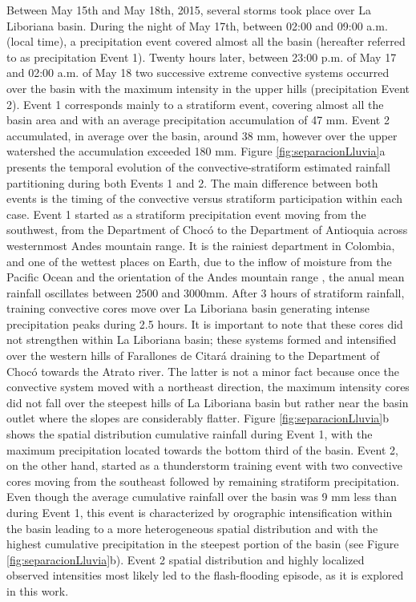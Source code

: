 \documentclass[hess, manuscript]{copernicus}
\begin{document}
Between May 15th and May 18th, 2015, several storms took place over La Liboriana basin.  During the night of May 17th, between 02:00 and 09:00 a.m. (local time), a precipitation event covered almost all the basin (hereafter referred to as precipitation Event 1).  Twenty hours later, between 23:00 p.m. of May 17 and 02:00 a.m. of May 18 two successive extreme convective systems occurred over the basin with the maximum intensity in the upper hills (precipitation Event 2).  Event 1 corresponds mainly to a stratiform event, covering almost all the basin area and with an average precipitation accumulation of 47 $\text{mm}$. Event 2 accumulated, in average over the basin, around 38 $\text{mm}$, however over the upper watershed the accumulation exceeded 180 $\text{mm}$. Figure \ref{fig:separacionLluvia}a presents the temporal evolution of the convective-stratiform estimated rainfall partitioning during both Events 1 and 2. The main difference between both events is the timing of the convective versus stratiform participation within each case. Event 1 started as a stratiform precipitation event moving from the southwest, from the Department of Chocó to the Department of Antioquia across westernmost Andes mountain range. It is the rainiest department in Colombia, and one of the wettest places on Earth, due to the inflow of moisture from the Pacific Ocean and the orientation of the Andes mountain range \citep{poveda2000, Mapes2003}, the anual mean rainfall oscillates between 2500 and 3000mm.  After 3 hours of stratiform rainfall, training convective cores move over La Liboriana basin generating intense precipitation peaks during 2.5 hours. It is important to note that these cores did not strengthen within La Liboriana basin; these systems formed and intensified over the western hills of Farallones de Citará draining to the Department of Chocó towards the Atrato river. The latter is not a minor fact because once the convective system moved with a northeast direction, the maximum intensity cores did not fall over the steepest hills of La Liboriana basin but rather near the basin outlet where the slopes are considerably flatter. Figure \ref{fig:separacionLluvia}b shows the spatial distribution cumulative rainfall during Event 1, with the maximum precipitation located towards the bottom third of the basin. Event 2, on the other hand, started as a thunderstorm training event with two convective cores moving from the southeast followed by remaining stratiform precipitation.  Even though the average cumulative rainfall over the basin was 9 mm less than during Event 1, this event is characterized by orographic intensification within the basin leading to a more heterogeneous spatial distribution and with the highest cumulative precipitation in the steepest portion of the basin (see Figure \ref{fig:separacionLluvia}b). Event 2 spatial distribution and highly localized observed intensities most likely led to the flash-flooding episode, as it is explored in this work. \\
\end{document}
